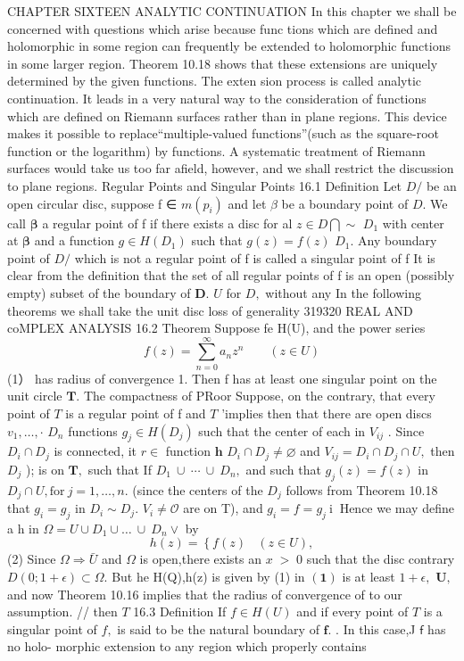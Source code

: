 CHAPTER SIXTEEN ANALYTIC CONTINUATION In this chapter we shall be concerned with questions which arise because func tions which are defined and holomorphic in some region can frequently be extended to holomorphic functions in some larger region. Theorem 10.18 shows that these extensions are uniquely determined by the given functions. The exten sion process is called analytic continuation. It leads in a very natural way to the consideration of functions which are defined on Riemann surfaces rather than in plane regions. This device makes it possible to replace“multiple-valued functions”(such as the square-root function or the logarithm) by functions. A systematic treatment of Riemann surfaces would take us too far afield, however, and we shall restrict the discussion to plane regions. Regular Points and Singular Points 16.1 Definition Let $D\!\!\!\!/$ be an open circular disc, suppose f ∈ $m(p_{i})$ and let $\beta$ be a boundary point of $D.$ We call $\boldsymbol{\beta}$ a regular point of f if there exists a disc for al $z\in D\bigcap\sim$ $D_{1}$ with center at $\boldsymbol{\beta}$ and a function $g\in H(D_{1})$ such that $g(z)=f(z)$ $D_{1}.$ Any boundary point of $D\!\!\!\!/$ which is not a regular point of f is called a singular point of f It is clear from the definition that the set of all regular points of f is an open (possibly empty) subset of the boundary of ${\boldsymbol{D}}.$ $U$ for $D,$ without any In the following theorems we shall take the unit disc loss of generality 319320 REAL AND coMPLEX ANALYSIS 16.2 Theorem Suppose fe H(U), and the power series $$ f(z)=\sum_{n=0}^{\infty}a_{n}z^{n}\qquad(z\in U) $$ (1） has radius of convergence 1. Then f has at least one singular point on the unit circle ${\boldsymbol{T}}.$ The compactness of PRoor Suppose, on the contrary, that every point of ${\mathbf{}}T$ is a regular point of f and ${\mathbf{}}T$ 'implies then that there are open discs $v_{1},\ldots,\cdot$ $D_{n}$ functions $g_{j}\in H(D_{j})$ such that the center of each in $V_{i j}$ . Since $D_{i}\cap D_{j}$ is connected, it $r\in$ function ${\boldsymbol{h}}$ $D_{i}\cap D_{j}\neq\varnothing$ and $V_{i j}=D_{i}\cap D_{j}\cap U,$ then $D_{j}$ ); is on ${\boldsymbol{T}},$ such that If $D_{1}\ \cup\ \cdots\ \cup\ D_{n},$ and such that $g_{j}(z)=f(z)$ in $D_{j}\cap U,{\mathrm{for~}}j=1,\ldots,n.$ (since the centers of the $D_{j}$ follows from Theorem 10.18 that $g_{i}=g_{j}$ in $D_{i}\sim D_{j}.$ $V_{i}\neq{\mathcal{O}}$ are on T), and $g_{i}=f=g_{j}\mathrm{~i~}$ Hence we may define a h in $\Omega=U\cup D_{1}\cup\dots\ \cup\ D_{n}\lor$ by $$ h(z)=\left\{f(z)\right.\ \ \ \ (z\in U), $$ (2) Since $\Omega\Rightarrow{\bar{U}}$ and $\Omega$ is open,there exists an $\scriptstyle x\;>\;0$ such that the disc contrary $D(0;1+\epsilon)\subset\Omega.$ But he H(Q),h(z) is given by (1) in $\mathbf{(1)}$ is at least $1+\epsilon,$ ${\boldsymbol{U}},$ and now Theorem 10.16 implies that the radius of convergence of to our assumption. // then ${\mathbf{}}T$ 16.3 Definition If $f\in H(U)$ and if every point of ${\mathbf{}}T$ is a singular point of $f,$ is said to be the natural boundary of ${\boldsymbol{f}}.$ . In this case,J $\boldsymbol{\mathsf{f}}$ has no holo- morphic extension to any region which properly contains 
